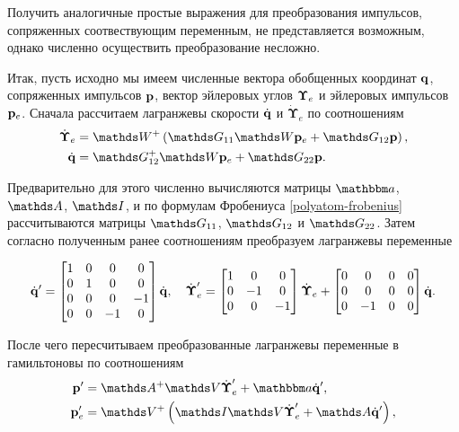 Получить аналогичные простые выражения для преобразования импульсов, сопряженных соотвествующим переменным, не представляется возможным, однако численно осуществить преобразование несложно. \par
Итак, пусть исходно мы имеем численные вектора обобщенных координат $\mathbf{q}$, сопряженных импульсов $\mathbf{p}$, вектор эйлеровых углов $\boldsymbol{\Upsilon}_e$ и эйлеровых импульсов $\mathbf{p}_e$. Сначала рассчитаем лагранжевы скорости $\dot{\mathbf{q}}$ и $\dot{\boldsymbol{\Upsilon}}_e$ по соотношениям
\begin{gather}
    \begin{aligned}
        \dot{\boldsymbol{\Upsilon}}_e &= \bbW^+ \lb \bbG_{11} \bbW \pe + \bbG_{12} \mf{p} \rb, \\
        \dot{\mf{q}} &= \bbG_{12}^+ \bbW \pe + \bbG_{22} \mf{p}.
    \end{aligned}
\end{gather}

Предварительно для этого численно вычисляются матрицы $\bba$, $\bbA$, $\bbI$, и по формулам Фробениуса \eqref{polyatom-frobenius} рассчитываются матрицы $\bbG_{11}$, $\bbG_{12}$ и $\bbG_{22}$. Затем согласно полученным ранее соотношениям преобразуем лагранжевы переменные 

\begin{gather}
    \dot{\mathbf{q}}^\prime = 
    \begin{bmatrix}
        1 & 0 & 0 & 0 \\
        0 & 1 & 0 & 0 \\
        0 & 0 & 0 & -1 \\
        0 & 0 & -1 & 0 
    \end{bmatrix} \dot{\mathbf{q}}, \quad
    \dot{\boldsymbol{\Upsilon}}_e^\prime = 
    \begin{bmatrix}
        1 & 0 & 0 \\
        0 & -1 & 0 \\
        0 & 0 & -1
    \end{bmatrix}
    \dot{\boldsymbol{\Upsilon}}_e + 
    \begin{bmatrix}
        0 & 0 & 0 & 0 \\
        0 & 0 & 0 & 0 \\
        0 & -1 & 0 & 0 
    \end{bmatrix}
    \dot{\mathbf{q}}.
\end{gather}

После чего пересчитываем преобразованные лагранжевы переменные в гамильтоновы по соотношениям
\begin{gather}
    \begin{aligned}
        \mf{p}^\prime &= \bbA^+ \bbV \dot{\boldsymbol{\Upsilon}}_e^\prime + \bba \dot{\mf{q}}^\prime, \\
        \pe^\prime &= \bbV^+ \lb \bbI \bbV \dot{\boldsymbol{\Upsilon}}_e^\prime + \bbA \dot{\mf{q}}^\prime \rb, 
    \end{aligned}
\end{gather}

